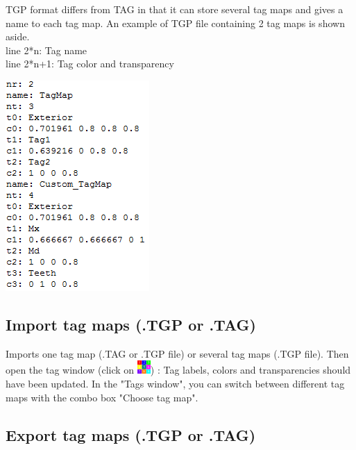 \begin{minipage}{0.55\textwidth}
TGP format differs from TAG in that it can store several tag maps and gives a name to each tag map. An example of TGP file containing 2 tag maps is shown aside.\\
line 2*n: Tag name\\
line 2*n+1: Tag color and transparency
\end{minipage}  
 \begin{minipage}{0.45\textwidth}\centering
  \includegraphics[scale=0.5]{images/07/tagmaps/TGP_file.png}
 \end{minipage} 

\noindent



\subsection{Import tag maps (.TGP or .TAG)}
Imports one tag map (.TAG or .TGP file) or several tag maps (.TGP file). Then open the tag window (click on \includegraphics[scale=0.7]{images/07/tagmaps/tagmaps.png}) : Tag labels, colors and transparencies should have been updated. In the "Tags window", you can switch between different tag maps with the combo box "Choose tag map".

\subsection{Export tag maps (.TGP or .TAG)}

